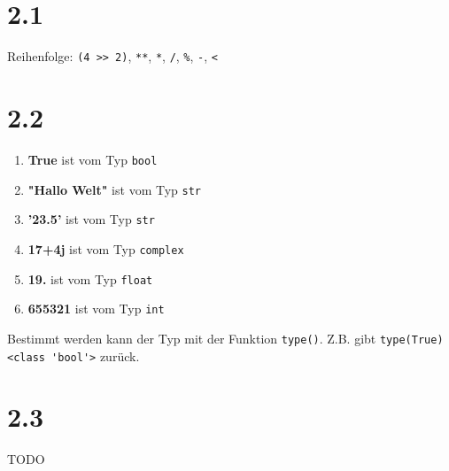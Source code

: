 \section*{2.1}
Reihenfolge: \verb+(4 >> 2)+, \verb+**+, \verb+*+, \verb+/+, \verb+%+, \verb+-+, \verb+<+

\section*{2.2}
\begin{enumerate}
    \item \textbf{True} ist vom Typ \verb+bool+
    \item \textbf{"Hallo Welt"} ist vom Typ \verb+str+
    \item \textbf{'23.5'} ist vom Typ \verb+str+
    \item \textbf{17+4j} ist vom Typ \verb+complex+
    \item \textbf{19.} ist vom Typ \verb+float+
    \item \textbf{655321} ist vom Typ \verb+int+
\end{enumerate}
Bestimmt werden kann der Typ mit der Funktion \verb+type()+. Z.B. gibt \verb+type(True)+ \verb+<class 'bool'>+ zurück.

\section*{2.3}
TODO